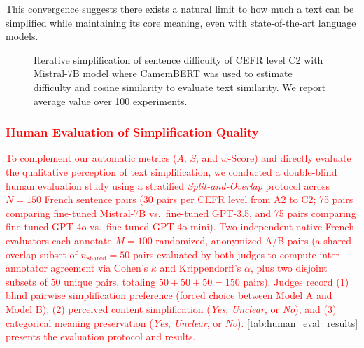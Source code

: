This convergence suggests there exists a natural limit to how much a text can be simplified while maintaining its core meaning, even with state-of-the-art language models.

\begin{figure}[H]
    \centering

    \caption{ Iterative simplification of sentence difficulty of CEFR level C2 with Mistral-7B model where CamemBERT was used to estimate difficulty and cosine similarity to evaluate text similarity. We report average value over 100 experiments. }
    \label{fig:iterative_simplification}
\end{figure}

\providecommand{\HumanKappaPref}{0.42}
\providecommand{\HumanKappaSimpler}{0.43}
\providecommand{\HumanKappaMeaning}{0.33}
\providecommand{\HumanAlphaKrip}{0.46}
\providecommand{\HumanWinMistral}{45.0\%}
\providecommand{\HumanWinGPTThreeFive}{55.0\%}
\providecommand{\HumanWinGPTFour}{58.0\%}
\providecommand{\HumanWinGPTFourMini}{42.0\%}
\providecommand{\HumanSimplerMistral}{78.0\%}
\providecommand{\HumanSimplerGPTThreeFive}{80.0\%}
\providecommand{\HumanSimplerGPTFour}{90.0\%}
\providecommand{\HumanSimplerGPTFourMini}{77.0\%}
\providecommand{\HumanMeaningMistral}{45.0\%}
\providecommand{\HumanMeaningGPTThreeFive}{64.0\%}
\providecommand{\HumanMeaningGPTFour}{78.0\%}
\providecommand{\HumanMeaningGPTFourMini}{67.0\%}

\subsubsection{\textcolor{red}{Human Evaluation of Simplification Quality}}\label{subsubsec:human_eval}
\textcolor{red}{To complement our automatic metrics ($A$, $S$, and $w\text{-Score}$) and directly evaluate the qualitative perception of text simplification, we conducted a double-blind human evaluation study using a stratified \textit{Split-and-Overlap} protocol across $N = 150$ French sentence pairs (30 pairs per CEFR level from A2 to C2; 75 pairs comparing fine-tuned Mistral-7B vs.\ fine-tuned GPT-3.5, and 75 pairs comparing fine-tuned GPT-4o vs.\ fine-tuned GPT-4o-mini). Two independent native French evaluators each annotate $M = 100$ randomized, anonymized A/B pairs (a shared overlap subset of $n_{\text{shared}} = 50$ pairs evaluated by both judges to compute inter-annotator agreement via Cohen's $\kappa$ and Krippendorff's $\alpha$, plus two disjoint subsets of 50 unique pairs, totaling $50 + 50 + 50 = 150$ pairs). Judges record (1) blind pairwise simplification preference (forced choice between Model A and Model B), (2) perceived content simplification (\textit{Yes}, \textit{Unclear}, or \textit{No}), and (3) categorical meaning preservation (\textit{Yes}, \textit{Unclear}, or \textit{No}). \autoref{tab:human_eval_results} presents the evaluation protocol and results.}


